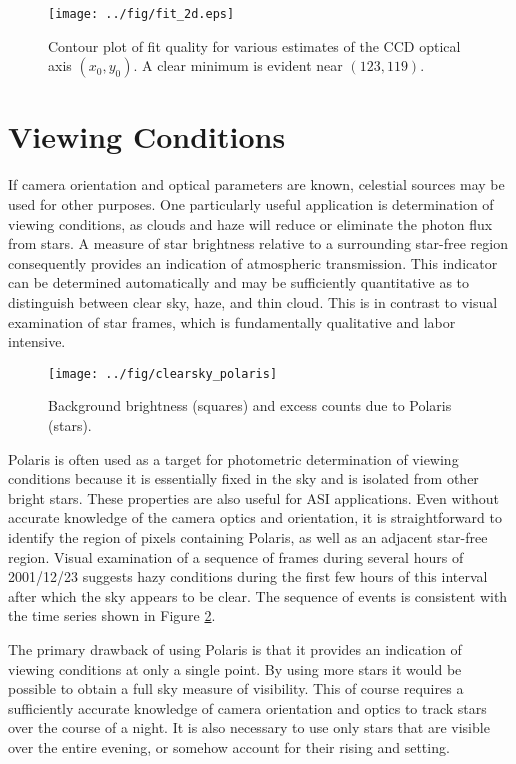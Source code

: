 \documentclass[11pt,twoside]{article}   %
\begin{document}
\begin{figure}[htb!]
  \texttt{[image: ../fig/fit\_2d.eps]}
    \caption{Contour plot of fit quality for various estimates of
    the CCD optical axis $(x_0,y_0)$.  A clear minimum is evident
    near $(123,119)$.
     \label{fig:fit_2d}  }
\end{figure}


\clearpage
\section{Viewing Conditions}

If camera orientation and optical parameters are known, celestial
sources may be used for other purposes.  One particularly useful
application is determination of viewing conditions, as clouds and
haze will reduce or eliminate the photon flux from stars. A
measure of star brightness relative to a surrounding star-free
region consequently provides an indication of atmospheric
transmission. This indicator can be determined automatically and
may be sufficiently quantitative as to distinguish between clear
sky, haze, and thin cloud.  This is in contrast to visual
examination of star frames, which is fundamentally qualitative and
labor intensive.

\begin{figure}[hbt!]
  \texttt{[image: ../fig/clearsky\_polaris]}
    \caption[Clear sky estimates using Polaris]
   {Background brightness (squares) and excess counts due to
   Polaris (stars).
     \label{fig:clearsky_polaris}  }
\end{figure}

Polaris is often used as a target for photometric determination of
viewing conditions because it is essentially fixed in the sky and
is isolated from other bright stars.  These properties are also
useful for ASI applications.  Even without accurate knowledge of
the camera optics and orientation, it is straightforward to
identify the region of pixels containing Polaris, as well as an
adjacent star-free region.  Visual examination of a sequence of
frames during several hours of 2001/12/23 suggests hazy conditions
during the first few hours of this interval after which the sky
appears to be clear. The sequence of events is consistent with the
time series shown in Figure \ref{fig:clearsky_polaris}.

The primary drawback of using Polaris is that it provides an
indication of viewing conditions at only a single point.  By using
more stars it would be possible to obtain a full sky measure of
visibility.  This of course requires a sufficiently accurate
knowledge of camera orientation and optics to track stars over the
course of a night.  It is also necessary to use only stars that
are visible over the entire evening, or somehow account for their
rising and setting.
\end{document}
